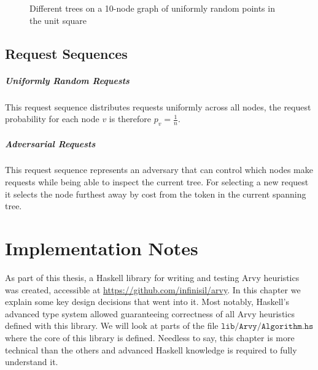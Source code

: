 \documentclass[a4paper, oneside]{discothesis}
\begin{document}
\begin{figure}
\caption{Different trees on a 10-node graph of uniformly random points in the unit square}
\label{tree-examples}
\end{figure}

\section{Request Sequences}
\label{request-sequences}

\paragraph{Uniformly Random Requests}\label{req:random} This request sequence distributes requests uniformly across all nodes, the request probability for each node $v$ is therefore $p_v=\frac{1}{n}$.

\paragraph{Adversarial Requests}\label{req:adversary} This request sequence represents an adversary that can control which nodes make requests while being able to inspect the current tree. For selecting a new request it selects the node furthest away by cost from the token in the current spanning tree.

\chapter{Implementation Notes}

As part of this thesis, a Haskell library for writing and testing Arvy heuristics was created, accessible at \url{https://github.com/infinisil/arvy}. In this chapter we explain some key design decisions that went into it. Most notably, Haskell's advanced type system allowed guaranteeing correctness of all Arvy heuristics defined with this library. We will look at parts of the file \href{https://github.com/Infinisil/arvy/blob/1bdac2aa8e599372f2b058d26ec9c33fd53d7a72/lib/Arvy/Algorithm.hs}{$\texttt{lib/Arvy/Algorithm.hs}$} where the core of this library is defined. Needless to say, this chapter is more technical than the others and advanced Haskell knowledge is required to fully understand it.
\end{document}
